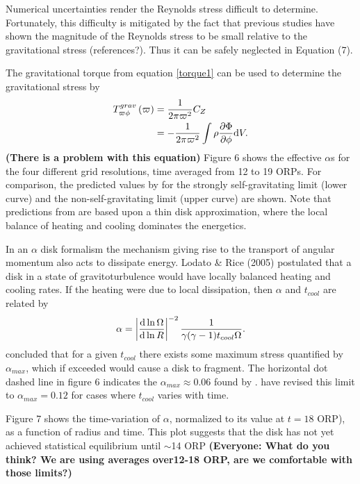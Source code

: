 \documentclass[manuscript]{aastex} %
\begin{document}
Numerical uncertainties render the Reynolds stress difficult to determine. Fortunately, this difficulty is mitigated by the fact that previous studies have shown the magnitude of the Reynolds stress to be small relative to the gravitational stress (references?).
Thus it can be safely neglected in Equation (7).

The gravitational torque from equation \ref{torque1} can be used to determine the
gravitational stress by
\begin{equation}
\begin{split}
 T_{\varpi\phi}^{grav}\left( \varpi \right) & = \frac{1}{2\pi\varpi^2}C_Z\\
                                & = - \frac{1}{2\pi\varpi^2} \int \rho\frac{\partial\Phi}{\partial\phi} {\rm d}V.
\end{split}
\end{equation}
{\bf (There is a problem with this equation)}
Figure 6 shows the effective $\alpha$s for the four different grid resolutions, time averaged from 12 to 19 ORPs. For comparison, the predicted values by \citet{gammie2001} for the strongly self-gravitating limit (lower curve) and the non-self-gravitating limit (upper curve) are shown. Note that predictions from are based upon a thin
disk approximation, where the local balance of heating and cooling dominates the energetics.

In an $\alpha$ disk formalism the mechanism giving rise to the transport of angular momentum also acts to dissipate energy. Lodato \& Rice (2005) postulated that a disk in a state of gravitoturbulence would have locally balanced heating and cooling rates. If the heating were due to local dissipation, then $\alpha$ and $t_{cool}$ are related by
\begin{equation}
\alpha = \left| \frac{{\rm d}\ln \Omega}{{\rm d} \ln R} \right|^{-2}
\frac{1}{\gamma(\gamma - 1) t_{cool}\Omega}.
\end{equation}
\citet{rice2005} concluded that for a given $t_{cool}$  there exists some maximum stress quantified by $\alpha_{max}$, which if exceeded would cause a disk to fragment. The horizontal dot dashed line in figure 6 indicates the $\alpha_{max} \approx 0.06$ found by \citeauthor{rice2005}. \citet{clarke2007} have revised this limit to $\alpha_{max} = 0.12$ for cases where $t_{cool}$  varies with time. 

Figure 7 shows the time-variation of $\alpha$, normalized to its value at $t = 18$ ORP), as a function of radius and  time.  This plot suggests that the disk has not yet achieved statistical equilibrium until $\sim $14 ORP {\bf (Everyone:  What do you think?  We are using averages over12-18 ORP,
are we comfortable with those limits?)}
\end{document}

